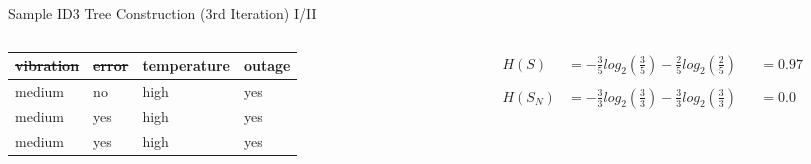 \documentclass[document.tex]{subfiles}
\begin{document}
\begin{frame}{Sample ID3 Tree Construction (3rd Iteration) I/II}
\begin{columns}
\begin{column}{0.4\textwidth}
\begin{table}
{\begin{tabular}{llll}
                            \toprule
                            \textbf{\sout{vibration}} & \textbf{\sout{error}} & \textbf{temperature} & \textbf{outage} \\
                            \midrule
                            \rowcolor{LightGreen}
                            medium &    no &        high &    yes \\
                            \rowcolor{LightGreen}
                            medium &   yes &        high &    yes \\
                            \rowcolor{LightGreen}
                            medium &   yes &        high &    yes \\
                            \bottomrule
                        \end{tabular}
                    }
                \end{table}
                \vspace*{-6mm}
                \begin{table}
                    \caption*{\footnotesize Attribute $A=TEMPERATURE$, Sample $S_L$ \normalsize}
                    \vspace*{-2mm}
                \end{table}
            \end{column}
            \begin{column}{0.6\textwidth}
                \begin{alignat*}{3}
                    H(S) &= -\frac{3}{5}log_2(\frac{3}{5}) - \frac{2}{5}log_2(\frac{2}{5}) &&= 0.97 \\\\
                    H(S_N) &= -\frac{3}{3}log_2(\frac{3}{3}) - \frac{3}{3}log_2(\frac{3}{3}) &&= 0.0 \\

\end{alignat*}
\end{column}
\end{columns}
\end{frame}
\end{document}
